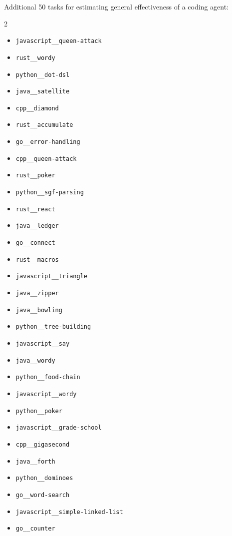 \documentclass{article} %
\begin{document}
Additional 50 tasks for estimating general effectiveness of a coding agent:

\begin{multicols}{2}
\begin{itemize}
    \item \texttt{javascript\_\_queen-attack}
    \item \texttt{rust\_\_wordy}
    \item \texttt{python\_\_dot-dsl}
    \item \texttt{java\_\_satellite}
    \item \texttt{cpp\_\_diamond}
    \item \texttt{rust\_\_accumulate}
    \item \texttt{go\_\_error-handling}
    \item \texttt{cpp\_\_queen-attack}
    \item \texttt{rust\_\_poker}
    \item \texttt{python\_\_sgf-parsing}
    \item \texttt{rust\_\_react}
    \item \texttt{java\_\_ledger}
    \item \texttt{go\_\_connect}
    \item \texttt{rust\_\_macros}
    \item \texttt{javascript\_\_triangle}
    \item \texttt{java\_\_zipper}
    \item \texttt{java\_\_bowling}
    \item \texttt{python\_\_tree-building}
    \item \texttt{javascript\_\_say}
    \item \texttt{java\_\_wordy}
    \item \texttt{python\_\_food-chain}
    \item \texttt{javascript\_\_wordy}
    \item \texttt{python\_\_poker}
    \item \texttt{javascript\_\_grade-school}
    \item \texttt{cpp\_\_gigasecond}
    \item \texttt{java\_\_forth}
    \item \texttt{python\_\_dominoes}
    \item \texttt{go\_\_word-search}
    \item \texttt{javascript\_\_simple-linked-list}
    \item \texttt{go\_\_counter}

\end{itemize}
\end{multicols}
\end{document}
